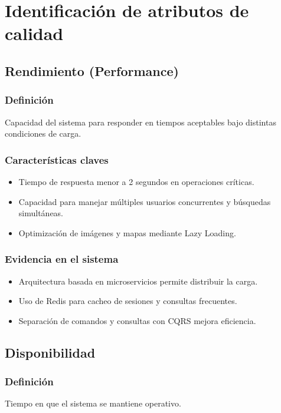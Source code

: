 \section{Identificación de atributos de calidad}
	\subsection{Rendimiento (Performance)}
		\subsubsection*{Definición}
			\noindent Capacidad del sistema para responder en tiempos aceptables bajo distintas condiciones de carga.
		
		\subsubsection*{Características claves}
			\begin{itemize}
				\item Tiempo de respuesta menor a 2 segundos en operaciones críticas.
				\item Capacidad para manejar múltiples usuarios concurrentes y búsquedas simultáneas.
				\item Optimización de imágenes y mapas mediante Lazy Loading.
			\end{itemize}
		
		\subsubsection*{Evidencia en el sistema}
			\begin{itemize}
				\item Arquitectura basada en microservicios permite distribuir la carga.
				\item Uso de Redis para cacheo de sesiones y consultas frecuentes.
				\item Separación de comandos y consultas con CQRS mejora eficiencia.
			\end{itemize}
	
	\subsection{Disponibilidad}
		\subsubsection*{Definición}
			\noindent Tiempo en que el sistema se mantiene operativo.
		
